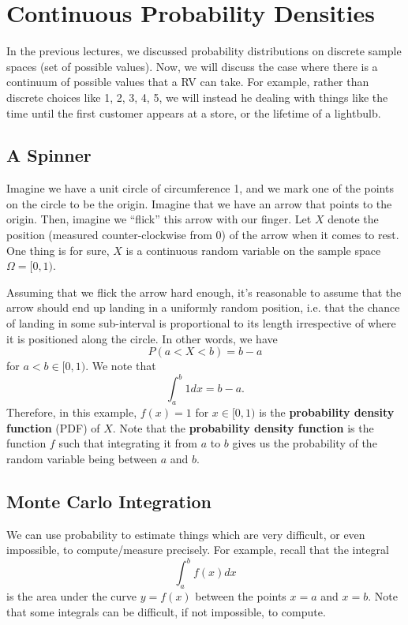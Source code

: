 \documentclass[letterpaper]{article}
\begin{document}
\section{Continuous Probability Densities}
In the previous lectures, we discussed probability distributions on discrete sample spaces (set of possible values). Now, we will discuss the case where there is a continuum of possible values that a RV can take. For example, rather than discrete choices like 1, 2, 3, 4, 5, we will instead he dealing with things like the time until the first customer appears at a store, or the lifetime of a lightbulb. 

\subsection{A Spinner}
Imagine we have a unit circle of circumference 1, and we mark one of the points on the circle to be the origin. Imagine that we have an arrow that points to the origin. Then, imagine we ``flick'' this arrow with our finger. Let $X$ denote the position (measured counter-clockwise from 0) of the arrow when it comes to rest. One thing is for sure, $X$ is a continuous random variable on the sample space $\Omega = [0, 1)$.

\bigskip 

Assuming that we flick the arrow hard enough, it's reasonable to assume that the arrow should end up landing in a uniformly random position, i.e. that the chance of landing in some sub-interval is proportional to its length irrespective of where it is positioned along the circle. In other words, we have 
\[P(a < X < b) = b - a\]
for $a < b \in [0, 1)$. We note that 
\[\int_a^b 1dx = b - a.\]
Therefore, in this example, $f(x) = 1$ for $x \in [0, 1)$ is the \textbf{probability density function} (PDF) of $X$. Note that the \textbf{probability density function} is the function $f$ such that integrating it from $a$ to $b$ gives us the probability of the random variable being between $a$ and $b$. 


\subsection{Monte Carlo Integration}
We can use probability to estimate things which are very difficult, or even impossible, to compute/measure precisely. For example, recall that the integral 
\[\int_a^b f(x) dx\]
is the area under the curve $y = f(x)$ between the points $x = a$ and $x = b$. Note that some integrals can be difficult, if not impossible, to compute. 
\end{document}
